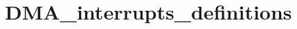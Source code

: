 \hypertarget{group___d_m_a__interrupts__definitions}{\section{D\-M\-A\-\_\-interrupts\-\_\-definitions}
\label{group___d_m_a__interrupts__definitions}
}
